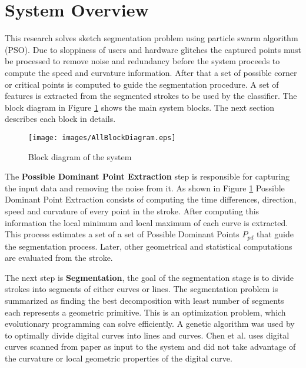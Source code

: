 \section{System Overview}
\label{sec:AnOverviewOfTheSystem}
   This research solves sketch segmentation problem using particle swarm algorithm (PSO).  Due to sloppiness of users and hardware glitches the captured points must be processed to remove noise and redundancy before the system proceeds to compute the speed and curvature information. After that a set of possible corner or critical points is computed to guide the segmentation procedure.  A set of features is extracted from the segmented strokes to be used by the classifier.  %
The block diagram in Figure \ref{fig:Blockdiagram} shows the main system blocks. The next section describes each block in details.
\begin{figure}[p]
	\centering
	
\begin{center}
	\texttt{[image: images/AllBlockDiagram.eps]}
	\caption[The System Block Diagram]{Block diagram of the system}
	\label{fig:Blockdiagram}
\end{center}
\end{figure}
 


The \textbf{Possible Dominant Point Extraction} step is responsible for capturing the input data and removing the noise from it. As shown in Figure \ref{fig:Blockdiagram} Possible Dominant Point Extraction consists of computing the time differences, direction, speed and curvature of every point in the stroke. After computing this information the local minimum and local maximum of each curve is extracted. This process estimates a set of a set of Possible Dominant Points $P_{pd}$ that guide the segmentation process. Later, other geometrical and statistical computations are evaluated from the stroke. %
 
  
The next step is \textbf{Segmentation}, the goal of the segmentation stage is to divide strokes into segments of either curves or lines. The segmentation problem is summarized as finding the best decomposition with least number of segments each represents a geometric primitive. This is an optimization problem, which evolutionary programming can solve efficiently. A genetic algorithm was used by \cite{CruveDivisionSwarm} to optimally divide digital curves into lines and curves. Chen et al.\cite{CruveDivisionSwarm} uses digital curves scanned from paper as input to the system and did not take advantage of the curvature or local geometric properties of the digital curve.

